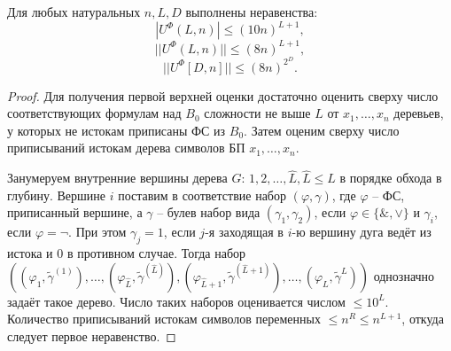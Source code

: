 \documentclass[11pt]{article}
\newcounter{th}\setcounter{th}{0}
\newcounter{stnmt}\setcounter{stnmt}{0}
\def\st{\par\smallskip\refstepcounter{stnmt}\textbf{\arabic{stnmt}}}
\newtheorem*{Statement}{Утверждение \st}
\begin{document}
\begin{Statement}
Для любых натуральных $n, L, D$ выполнены неравенства:
\begin{equation*}
|U^{\Phi}(L, n)| \leq (10n)^{L + 1}, 
\end{equation*}
\begin{equation*}
||U^{\Phi}(L, n)|| \leq (8n)^{L + 1},
\end{equation*}
\begin{equation*}
||U^{\Phi}[D, n]|| \leq (8n)^{2^D}.
\end{equation*}
\end{Statement}
\begin{proof}
Для получения первой верхней оценки достаточно оценить сверху число соответствующих формулам
над $B_0$ сложности не выше $L$ от $x_1, \ldots, x_n$ деревьев, у которых не истокам приписаны
ФС из $B_0$. Затем оценим сверху число приписываний истокам дерева символов БП $x_1, \ldots, x_n$.

Занумеруем внутренние вершины дерева $G$: $1, 2, \ldots, \hat{L}, \hat{L} \leq L$ в порядке
обхода в глубину. Вершине $i$ поставим в соответствие набор $(\varphi, \gamma)$, где $\varphi$
-- ФС, приписанный вершине, а $\gamma$ -- булев набор вида $(\gamma_1, \gamma_2)$, если
$\varphi \in \{\&, \vee\}$ и $\gamma_i$, если $\varphi = \neg$. При этом $\gamma_j = 1$, если
$j$-я заходящая в $i$-ю вершину дуга ведёт из истока и $0$ в противном случае. Тогда набор
$((\varphi_1, \tilde{\gamma}^{(1)}), \ldots, (\varphi_{\hat{L}}, \tilde{\gamma}^{(\hat{L})}), (\varphi_{\hat{L} + 1}, \tilde{\gamma}^{(\hat{L} + 1)}), \ldots, (\varphi_L, \tilde{\gamma}^L))$
однозначно задаёт такое дерево. Число таких наборов оценивается числом $\leq 10^L$.
Количество приписываний истокам символов переменных $\leq n^R \leq n^{L + 1}$, откуда следует
первое неравенство.
\end{proof}
\end{document}
